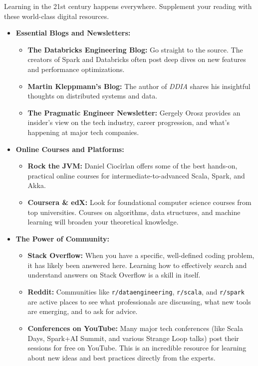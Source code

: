 \documentclass[
  letterpaper,
  DIV=11,
  numbers=noendperiod]{scrreprt}
\providecommand{\tightlist}{%
  \setlength{\itemsep}{0pt}\setlength{\parskip}{0pt}}
\begin{document}
Learning in the 21st century happens everywhere. Supplement your reading
with these world-class digital resources.

\begin{itemize}
\tightlist
\item
  \textbf{Essential Blogs and Newsletters:}

  \begin{itemize}
  \tightlist
  \item
    \textbf{The Databricks Engineering Blog:} Go straight to the source.
    The creators of Spark and Databricks often post deep dives on new
    features and performance optimizations.
  \item
    \textbf{Martin Kleppmann's Blog:} The author of \emph{DDIA} shares
    his insightful thoughts on distributed systems and data.
  \item
    \textbf{The Pragmatic Engineer Newsletter:} Gergely Orosz provides
    an insider's view on the tech industry, career progression, and
    what's happening at major tech companies.
  \end{itemize}
\item
  \textbf{Online Courses and Platforms:}

  \begin{itemize}
  \tightlist
  \item
    \textbf{Rock the JVM:} Daniel Ciocîrlan offers some of the best
    hands-on, practical online courses for intermediate-to-advanced
    Scala, Spark, and Akka.
  \item
    \textbf{Coursera \& edX:} Look for foundational computer science
    courses from top universities. Courses on algorithms, data
    structures, and machine learning will broaden your theoretical
    knowledge.
  \end{itemize}
\item
  \textbf{The Power of Community:}

  \begin{itemize}
  \tightlist
  \item
    \textbf{Stack Overflow:} When you have a specific, well-defined
    coding problem, it has likely been answered here. Learning how to
    effectively search and understand answers on Stack Overflow is a
    skill in itself.
  \item
    \textbf{Reddit:} Communities like \texttt{r/dataengineering},
    \texttt{r/scala}, and \texttt{r/spark} are active places to see what
    professionals are discussing, what new tools are emerging, and to
    ask for advice.
  \item
    \textbf{Conferences on YouTube:} Many major tech conferences (like
    Scala Days, Spark+AI Summit, and various Strange Loop talks) post
    their sessions for free on YouTube. This is an incredible resource
    for learning about new ideas and best practices directly from the
    experts.
  \end{itemize}
\end{itemize}
\end{document}
